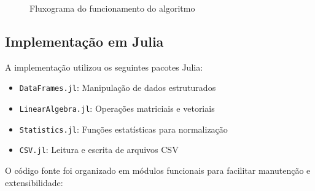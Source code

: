 \documentclass[12pt,a4paper]{article}
\begin{document}
\begin{figure}[H]
\centering
\begin{minipage}{0.8\textwidth}
\centering
{}
\end{minipage}
\caption{Fluxograma do funcionamento do algoritmo}
\label{fig:fluxograma}
\end{figure}

\subsection{Implementação em Julia}

A implementação utilizou os seguintes pacotes Julia:

\begin{itemize}
\item \texttt{DataFrames.jl}: Manipulação de dados estruturados
\item \texttt{LinearAlgebra.jl}: Operações matriciais e vetoriais
\item \texttt{Statistics.jl}: Funções estatísticas para normalização
\item \texttt{CSV.jl}: Leitura e escrita de arquivos CSV
\end{itemize}

O código fonte foi organizado em módulos funcionais para facilitar manutenção e extensibilidade:
\end{document}
